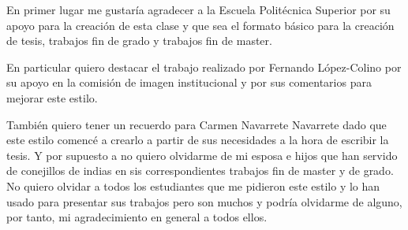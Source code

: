 En primer lugar me gustaría agradecer a la Escuela Politécnica Superior por su apoyo para la creación de esta clase y que sea el formato básico para la creación de tesis, trabajos fin de grado y trabajos fin de master.

En particular quiero destacar el trabajo realizado por Fernando López-Colino por su apoyo en la comisión de imagen institucional y por sus comentarios para mejorar este estilo.

También quiero tener un recuerdo para Carmen Navarrete Navarrete dado que este estilo comencé a crearlo a partir de sus necesidades a la hora de escribir la tesis. Y por supuesto a no quiero olvidarme de mi esposa e hijos que han servido de conejillos de indias en sis correspondientes trabajos fin de master y de grado. No quiero olvidar a todos los estudiantes que me pidieron este estilo y lo han usado para presentar sus trabajos pero son muchos y podría olvidarme de alguno, por tanto, mi agradecimiento en general a todos ellos.
